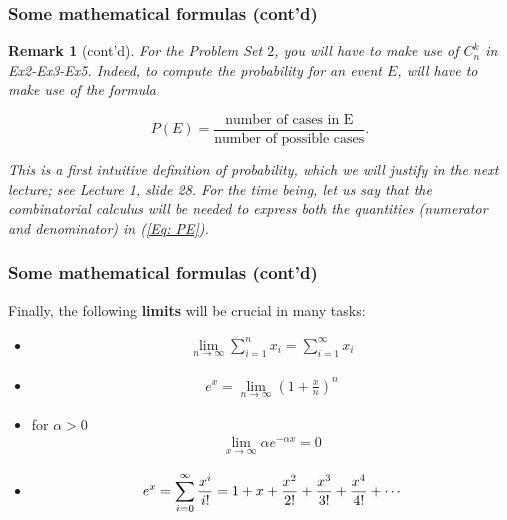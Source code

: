 \documentclass[notes=show,handout]{beamer}
\newtheorem{remark}{Remark}[section]
\newcommand{\bea}{\begin{eqnarray}}
\newcommand{\eea}{\end{eqnarray}}
\begin{document}
\begin{frame}
\frametitle{Some mathematical formulas (cont'd)}

\begin{remark} [cont'd]

For the Problem Set $2$, you will have to make use of $C^{k}_n$ in Ex2-Ex3-Ex5. Indeed, 
to compute the probability for an event $E$, will have to make use of the formula 

\begin{equation} \label{Eq: PE}
P(E)=\dfrac{\text{number of cases in E}}{\text{number of possible cases}}.
\end{equation}

This is a first intuitive definition of probability, which we will justify in the next lecture; see Lecture 1, slide 28. For the time being, let us say that the combinatorial calculus will be needed to express both the quantities (numerator
and denominator) in (\ref{Eq: PE}).  



\end{remark} 

\end{frame}


\begin{frame}
\frametitle{Some mathematical formulas (cont'd)}

Finally, the following \textbf{limits} will be crucial in many tasks:
\begin{itemize}
\item
\bea
\lim_{n \to \infty} \sum_{i=1}^n x_i = \sum_{i=1 }^\infty x_i \nonumber
\eea
\item
\bea
e^x = \lim_{n \rightarrow \infty} \left(1 + \frac{x}{n}\right)^n \nonumber
\eea
\item for $\alpha >0$
\bea
\lim_{x \to \infty} {\alpha e^{-\alpha x}} = 0 \nonumber
\eea
\item 
\bea
e^x = \sum_{i = 0}^{\infty} {x^i \over i!} = 1 + x + {x^2 \over 2!} + {x^3 \over 3!} + {x^4 \over 4!} + \cdots \nonumber
\eea

\end{itemize}
\end{frame}
\end{document}
